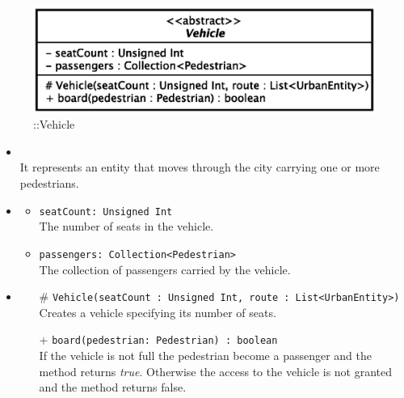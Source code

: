 \begin{figure}[h]
\centering
\includegraphics[scale=0.6,keepaspectratio]{images/solution/vehicle.eps}
\caption{\pActive::Vehicle}
\label{fig:sd-app-vehicle}
\end{figure}
\FloatBarrier
\begin{itemize}
  \item \textbf{\descr} \\
    It represents an entity that moves through the city carrying one or more
pedestrians.
  \item \textbf{\attrs}
  \begin{itemize}
    \item \texttt{seatCount: Unsigned Int} \\
The number of seats in the vehicle.
    \item \texttt{passengers: Collection<Pedestrian>} \\
The collection of passengers carried by the vehicle.
  \end{itemize}
  \item \textbf{\ops}
  \begin{itemize} 
    \item[\#] \texttt{Vehicle(seatCount : Unsigned Int, route : List<UrbanEntity>)} \\
Creates a vehicle specifying its number of seats.
    \item[+] \texttt{board(pedestrian: Pedestrian) : boolean} \\
If the vehicle is not full the pedestrian become a passenger and the method 
returns \textit{true}. Otherwise the access to the vehicle is not granted and 
the method returns false.
  \end{itemize}
\end{itemize}
